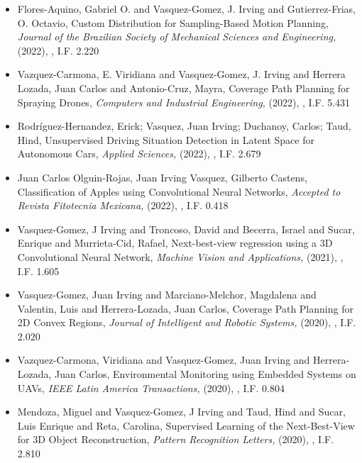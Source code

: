 \begin{itemize} 
\item Flores-Aquino, Gabriel O. and Vasquez-Gomez, J. Irving and Gutierrez-Frias, O. Octavio, Custom Distribution for Sampling-Based Motion Planning,\textit{ Journal of the Brazilian Society of Mechanical Sciences and Engineering,} (2022), \href{https://doi.org/10.1007/s40430-022-03379-0} {\faFilePdfO}, I.F. 2.220 
\item Vazquez-Carmona, E. Viridiana and Vasquez-Gomez, J. Irving and Herrera Lozada, Juan Carlos and Antonio-Cruz, Mayra, Coverage Path Planning for Spraying Drones,\textit{ Computers and Industrial Engineering,} (2022), \href{https://doi.org/10.1016/j.cie.2022.108125} {\faFilePdfO}, I.F. 5.431 
\item Rodríguez-Hernandez, Erick; Vasquez, Juan Irving; Duchanoy, Carlos; Taud, Hind, Unsupervised Driving Situation Detection in Latent Space for
Autonomous Cars,\textit{ Applied Sciences,} (2022), \href{https://doi.org/10.3390/app12073635} {\faFilePdfO}, I.F. 2.679 
\item Juan Carlos Olguin-Rojas, Juan Irving Vasquez, Gilberto Castens, Classification of Apples using Convolutional Neural Networks,\textit{ Accepted to Revista Fitotecnia Mexicana,} (2022), \href{} {\faFilePdfO}, I.F. 0.418 
\item Vasquez-Gomez, J Irving and Troncoso, David and Becerra, Israel and Sucar, Enrique and Murrieta-Cid, Rafael, Next-best-view regression using a 3D Convolutional Neural Network,\textit{ Machine Vision and Applications,} (2021), \href{https://doi.org/10.1007/s00138-020-01166-2} {\faFilePdfO}, I.F. 1.605 
\item Vasquez-Gomez, Juan Irving and Marciano-Melchor, Magdalena and Valentin, Luis and Herrera-Lozada, Juan Carlos, Coverage Path Planning for 2D Convex Regions,\textit{ Journal of Intelligent and Robotic Systems,} (2020), \href{https://doi.org/10.1007/s10846-019-01024-y} {\faFilePdfO}, I.F. 2.020 
\item Vazquez-Carmona, Viridiana and Vasquez-Gomez, Juan Irving and Herrera-Lozada, Juan Carlos, Environmental Monitoring using Embedded Systems on UAVs,\textit{ IEEE Latin America Transactions,} (2020), \href{https://latamt.ieeer9.org/index.php/transactions/article/view/2891/399} {\faFilePdfO}, I.F. 0.804 
\item Mendoza, Miguel and Vasquez-Gomez, J Irving and Taud, Hind and Sucar, Luis Enrique and Reta, Carolina, Supervised Learning of the Next-Best-View for 3D Object Reconstruction,\textit{ Pattern Recognition Letters,} (2020), \href{https://doi.org/10.1016/j.patrec.2020.02.024} {\faFilePdfO}, I.F. 2.810 

\end{itemize}
